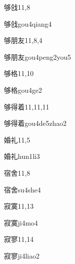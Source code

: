 \begin{entry}{够戗}{11,8}
  \begin{phonetics}{够戗}{gou4qiang4}
  \end{phonetics}
\end{entry}

\begin{entry}{够朋友}{11,8,4}
  \begin{phonetics}{够朋友}{gou4peng2you5}
  \end{phonetics}
\end{entry}

\begin{entry}{够格}{11,10}
  \begin{phonetics}{够格}{gou4ge2}
  \end{phonetics}
\end{entry}

\begin{entry}{够得着}{11,11,11}
  \begin{phonetics}{够得着}{gou4de5zhao2}
  \end{phonetics}
\end{entry}

\begin{entry}{婚礼}{11,5}
  \begin{phonetics}{婚礼}{hun1li3}
  \end{phonetics}
\end{entry}

\begin{entry}{宿舍}{11,8}
  \begin{phonetics}{宿舍}{su4she4}
  \end{phonetics}
\end{entry}

\begin{entry}{寂寞}{11,13}
  \begin{phonetics}{寂寞}{ji4mo4}
  \end{phonetics}
\end{entry}

\begin{entry}{寂寥}{11,14}
  \begin{phonetics}{寂寥}{ji4liao2}
  \end{phonetics}
\end{entry}

